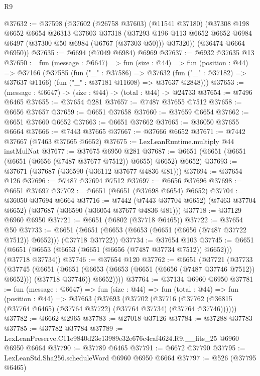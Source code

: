 \begin{lexlean}{R9}
\begin{coremodule}
@37632 := @37598
    (@37602
      (@26758 @37603)
      (@11541 @37180)
      (@37308
        @198
        @6652
        @6654
        @26313
        @37603
        @37318
        (@37293 @196 @113 @6652 @6652 @6984 @6497 (@37300 @50 @6984 (@6767 (@37303 @50))) @37320))
      (@36474 @6664 @6950))
@37635 := @6694 (@7049 @6984) @6969
@37637 := @6932 @37635 @13
@37650 := fun (message : @6647) =>
  fun (size : @44) =>
  fun (position : @44) =>
  @37166
    (@37585
      (fun ("_" : @37586) =>
      @37632 (fun ("_" : @37182) => @37637 @1166) (fun ("_" : @37181 @11608) => @37637 @2848)))
@37653 := (message : @6647) -> (size : @44) -> (total : @44) -> @24733
@37654 := @7496 @6465
@37655 := @37654 @281
@37657 := @7487 @37655 @7512
@37658 := @6656 @37657
@37659 := @6651 @37658
@37660 := @37659 @6654
@37662 := @6651 @37660 @6652
@37663 := @6651 @37662
@37665 := @36050 @37655 @6664
@37666 := @7443 @37665
@37667 := @37666 @6652
@37671 := @7442 @37667 (@7463 @37665 @6652)
@37675 := LexLeanRuntime.multiply @44 instMulNat
@37677 := @37675 @6950 @281
@37687 := @6651 (@6651 (@6651 (@6651 (@6656 (@7487 @37677 @7512)) @6655) @6652) @6652)
@37693 := @37671 (@37687 (@36590 (@36112 @37677 @4836 @81)))
@37694 := @37654 @126
@37696 := @7487 @37694 @7512
@37697 := @6656 @37696
@37698 := @6651 @37697
@37702 := @6651 (@6651 (@37698 @6654) @6652)
@37704 := @36050 @37694 @6664
@37716 := @7442
    (@7443 @37704 @6652)
    (@7463 @37704 @6652)
    (@37687 (@36590 (@36054 @37677 @4836 @81)))
@37718 := @37129 @6960 @6950
@37721 := @6651 (@6802 (@37718 @6465))
@37722 := @37654 @50
@37733 := @6651 (@6651 (@6653 (@6653 (@6651 (@6656 (@7487 @37722 @7512)) @6652))) (@37718 @37722))
@37734 := @37654 @103
@37745 := @6651 (@6651 (@6653 (@6653 (@6651 (@6656 (@7487 @37734 @7512)) @6652))) (@37718 @37734))
@37746 := @37654 @120
@37762 := @6651
    (@37721
      (@37733
        (@37745
          (@6651
            (@6651 (@6653 (@6653 (@6651 (@6656 (@7487 @37746 @7512)) @6652))) (@37718 @37746))
            @6652))))
@37764 := @37134 @6960 @6950
@37781 := fun (message : @6647) =>
  fun (size : @44) =>
  fun (total : @44) =>
  fun (position : @44) =>
  @37663
    (@37693
      (@37702
        (@37716 (@37762 (@36815 (@37764 @6465) (@37764 @37722) (@37764 @37734) (@37764 @37746))))))
@37782 := @6662 @2965
@37783 := @27018 @37126
@37784 := @37288 @37783
@37785 := @37782 @37784
@37789 := LexLeanPreserve.C11e9840d23e13989e32e676c4caf4624.R9.__fits_25 @6960 @6950 @6664
@37790 := @37789 @6465
@37791 := @6672 @37790
@37795 := LexLeanStd.Sha256.scheduleWord @6960 @6950 @6664
@37797 := @526 (@37795 @6465)

\end{coremodule}
\end{lexlean}

